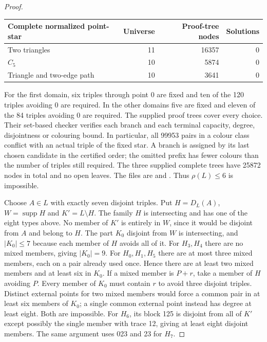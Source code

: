 \documentclass[11pt,a4paper]{article}
\numberwithin{equation}{section}
\theoremstyle{remark}
\begin{document}
\begin{proof}
\begin{center}
\begin{tabular}{l r r r}\toprule
Complete normalized point-star&Universe&Proof-tree nodes&Solutions\\\midrule
Two triangles&11&16357&0\\
$ C_5$&10&5874&0\\
Triangle and two-edge path&10&3641&0\\\bottomrule
\end{tabular}
\end{center}
For the first domain, six triples through point 0 are fixed and ten of
the 120 triples avoiding 0 are required. In the other domains five are
fixed and eleven of the 84 triples avoiding 0 are required. The supplied
proof trees cover every choice. Their set-based checker verifies each
branch and each terminal capacity, degree, disjointness or colouring
bound. In particular, all 99953 pairs in a colour class conflict with an
actual triple of the fixed star. A branch is assigned by its last chosen
candidate in the certified order; the omitted prefix has fewer colours
than the number of triples still required. The three supplied complete
trees have 25872 nodes in total and no open
leaves. The files are 
and . Thus $\rho(L)\le6$ is impossible.

Choose $ A\in L $ with exactly seven disjoint triples. Put $ H=D_L(A)$,
$ W=\operatorname{supp}H $ and $ K'=L\setminus H $. The family $ H $ is
intersecting and has one of the eight types above. No member of $ K'$ is
entirely in $ W $, since it would be disjoint from $ A $ and belong to $ H $.
The part $ K_0$ disjoint from $ W $ is intersecting, and $|K_0|\le 7$ because
each member of $ H $ avoids all of it.
For $ H_3,H_4$ there are no mixed members, giving $|K_0|=9$.
For $ H_0,H_1,H_5$ there are at most three mixed members, each on a pair
already used once. Hence there are at least two mixed members and at
least six in $ K_0$. If a mixed member is $ P+r $, take a member of $ H $
avoiding $ P $. Every member of $ K_0$ must contain $ r $ to avoid three
disjoint triples. Distinct external points for two mixed members would
force a common pair in at least six members of $ K_0$; a single common
external point instead has degree at least eight. Both are impossible.
For $ H_6$, its block 125 is disjoint from all of $ K'$ except possibly the
single member with trace 12, giving at least eight disjoint members.
The same argument uses 023 and 23 for $ H_7$.


\end{proof}
\end{document}
